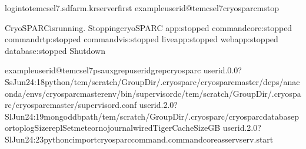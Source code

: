 \documentclass[a4paper,11pt,english]{sphinxmanual}
\begin{document}
\begin{sphinxVerbatim}[commandchars=\\\{\}]
logintotem\PYGZhy{}cs\PYGZhy{}el7.sdfarm.krserverfirst
exampleuserid@tem\PYGZhy{}cs\PYGZhy{}el7\PYGZdl{}\PYGZgt{}cryosparcmstop

CryoSPARCisrunning.
StoppingcryoSPARC
app:stopped
command\PYGZus{}core:stopped
command\PYGZus{}rtp:stopped
command\PYGZus{}vis:stopped
liveapp:stopped
webapp:stopped
database:stopped
Shutdown

exampleuserid@tem\PYGZhy{}cs\PYGZhy{}el7\PYGZdl{}\PYGZgt{}psauxgrep\PYGZlt{}userid\PYGZgt{}grepcryosparc
userid.0.0?SsJun24:18python/tem/scratch/\PYGZlt{}GroupDir\PYGZgt{}/.cryosparc/cryosparc\PYGZus{}master/deps/anaconda/envs/cryosparc\PYGZus{}master\PYGZus{}env/bin/supervisord\PYGZhy{}c/tem/scratch/\PYGZlt{}GroupDir\PYGZgt{}/.cryosparc/cryosparc\PYGZus{}master/supervisord.conf
userid.2.0?SlJun24:19mongod\PYGZhy{}\PYGZhy{}dbpath/tem/scratch/\PYGZlt{}GroupDir\PYGZgt{}/.cryosparc/cryosparc\PYGZus{}database\PYGZhy{}\PYGZhy{}port\PYGZhy{}\PYGZhy{}oplogSize\PYGZhy{}\PYGZhy{}replSetmeteor\PYGZhy{}\PYGZhy{}nojournal\PYGZhy{}\PYGZhy{}wiredTigerCacheSizeGB
userid.2.0?SlJun24:23python\PYGZhy{}cimportcryosparc\PYGZus{}command.command\PYGZus{}coreasservserv.start

\end{sphinxVerbatim}
\end{document}
